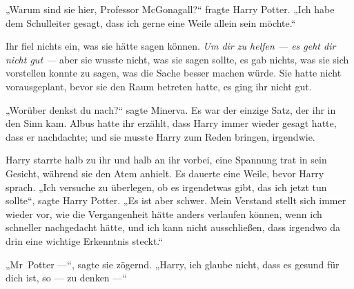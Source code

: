 „Warum sind sie hier, Professor McGonagall?“ fragte Harry Potter.
„Ich habe dem Schulleiter gesagt, dass ich gerne eine Weile allein sein möchte.“

Ihr fiel nichts ein, was sie hätte sagen können. \emph{Um dir zu helfen — es geht dir nicht gut —} aber sie wusste nicht, was sie sagen sollte, es gab nichts, was sie sich vorstellen konnte zu sagen, was die Sache besser machen würde. Sie hatte nicht vorausgeplant, bevor sie den Raum betreten hatte, es ging ihr nicht gut.

„Worüber denkst du nach?“ sagte Minerva.
Es war der einzige Satz, der ihr in den Sinn kam. Albus hatte ihr erzählt, dass Harry immer wieder gesagt hatte, dass er nachdachte; und sie musste Harry zum Reden bringen, irgendwie.



Harry starrte halb zu ihr und halb an ihr vorbei, eine Spannung trat in sein Gesicht, während sie den Atem anhielt. Es dauerte eine Weile, bevor Harry sprach.
„Ich versuche zu überlegen, ob es irgendetwas gibt, das ich jetzt tun sollte“, sagte Harry Potter.
„Es ist aber schwer. Mein Verstand stellt sich immer wieder vor, wie die Vergangenheit hätte anders verlaufen können, wenn ich schneller nachgedacht hätte, und ich kann nicht ausschließen, dass irgendwo da drin eine wichtige Erkenntnis steckt.“

„Mr~Potter —“, sagte sie zögernd.
„Harry, ich glaube nicht, dass es gesund für dich ist, so — zu denken —“

